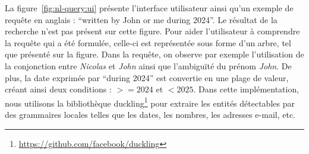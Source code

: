 La figure~\ref{fig:nl-query:ui} présente l'interface utilisateur ainsi qu'un exemple de requête en anglais : \enquote{written by John or me during 2024}.
Le résultat de la recherche n'est pas présent sur cette figure.
Pour aider l'utilisateur à comprendre la requête qui a été formulée, celle-ci est représentée sous forme d'un arbre, tel que présenté sur la figure.
Dans la requête, on observe par exemple l'utilisation de la conjonction  entre \emph{Nicolas} et \emph{John} ainsi que l'ambiguïté du prénom \emph{John}.
De plus, la date exprimée par \enquote{during 2024} est convertie en une plage de valeur, créant ainsi deux conditions : $>= 2024$ et $<2025$.
Dans cette implémentation, nous utilisons la bibliothèque \gls{duckling}\footnote{\url{https://github.com/facebook/duckling}} pour extraire les entités détectables par des grammaires locales telles que les dates, les nombres, les adresses e-mail, etc.

